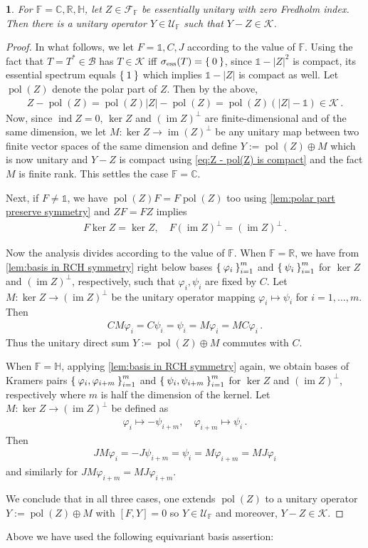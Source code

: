\documentclass[a4paper,10pt]{article}
\numberwithin{equation}{section}
\theoremstyle{plain}
\theoremstyle{plain}
\newtheorem{lem}[thm]{\protect\lemmaname}
\theoremstyle{plain}
\theoremstyle{plain}
\theoremstyle{plain}
\theoremstyle{remark}
\theoremstyle{definition}
\theoremstyle{plain}
\providecommand{\lemmaname}{Lemma}
\newcommand{\RR}{\mathbb{R}}
\newcommand{\CC}{\mathbb{C}}
\newcommand{\FF}{\mathbb{F}}
\newcommand{\calB}{\mathcal{B}}
\newcommand{\calF}{\mathcal{F}}
\newcommand{\calU}{\mathcal{U}}
\newcommand{\calK}{\mathcal{K}}
\newcommand{\Id}{\mathds{1}}
\newcommand{\HH}{\mathbb{H}}
\newcommand{\findex}{\operatorname{ind}}
\newcommand{\im}{\operatorname{im}}
\newcommand{\eq}[1]{\begin{align*}#1\end{align*}}
\newcommand{\eql}[1]{\begin{align}#1\end{align}}
\newcommand{\polar}{\operatorname{pol}}
\begin{document}
	\begin{lem}\label{lem:extension of zero index Fredholm RCH partial isometries to unitaries} For $\FF=\CC,\RR,\HH$, let $Z\in\calF_\FF$ be essentially unitary with zero Fredholm index. Then there is a unitary operator $Y\in\calU_\FF$ such that $Y-Z\in\calK$.
	\end{lem}
	\begin{proof}
		In what follows, we let $F=\Id,C,J$ according to the value of $\FF$. Using the fact that $T=T^\ast\in\calB$ has $T\in\calK$ iff $\sigma_{\mathrm{ess}}(T)=\Set{0}$, since $\Id-|Z|^2$ is compact, its essential spectrum equals $\Set{1}$ which implies $\Id-|Z|$ is compact as well. Let $\polar(Z)$ denote the polar part of $Z$. Then by the above, 
		\eql{ \label{eq:Z - pol(Z) is compact}
			Z-\polar(Z)=\polar(Z)|Z|-\polar(Z)=\polar(Z)(|Z|-\Id)\in\calK\,.
		} 
		Now, since $\findex Z=0$, $\ker Z$ and $(\im Z)^\perp$ are finite-dimensional and of the same dimension, we let $M:\ker Z \to \im(Z)^\perp$ be any unitary map between two finite vector spaces of the same dimension and define $Y:=\polar(Z)\oplus M$ which is now unitary and $Y-Z$ is compact using \cref{eq:Z - pol(Z) is compact} and the fact $M$ is finite rank. This settles the case $\FF=\CC$.
		
		Next, if $F\neq\Id$, we have $\polar(Z)F=F\polar(Z)$ too using \cref{lem:polar part preserve symmetry} and $ZF=FZ$ implies \eq{F\ker Z=\ker Z,\quad F(\im Z)^\perp=(\im Z)^\perp\,.} 
		
		Now the analysis divides according to the value of $\FF$. When $\FF=\RR$, we have from \cref{lem:basis in RCH symmetry} right below bases $\Set{\varphi_i}_{i=1}^m$ and $\Set{\psi_i}_{i=1}^m$ for $\ker Z$ and $(\im Z)^\perp$, respectively, such that $\varphi_i,\psi_i$ are fixed by $C$. Let $M:\ker Z\to (\im Z)^\perp$ be the unitary operator mapping $\varphi_i\mapsto \psi_i$ for  $i=1,\dots,m$. Then \eq{CM\varphi_i=C\psi_i=\psi_i=M\varphi_i=MC\varphi_i\,.} Thus the unitary direct sum $Y:=\polar(Z)\oplus M$ commutes with $C$. 
		
		When $\FF=\HH$, applying \cref{lem:basis in RCH symmetry} again, we obtain bases of Kramers pairs $\Set{\varphi_i,\varphi_{i+m}}_{i=1}^m$ and $\Set{\psi_i,\psi_{i+m}}_{i=1}^m$ for $\ker Z$ and $(\im Z)^\perp$, respectively where $m$ is half the dimension of the kernel. Let $M:\ker Z\to(\im Z)^\perp$ be defined as \eq{\varphi_i\mapsto -\psi_{i+m},\quad \varphi_{i+m}\mapsto \psi_i\,.} 
		Then \eq{JM\varphi_i=-J\psi_{i+m}=\psi_{i}=M\varphi_{i+m}=MJ\varphi_i} and similarly for $JM\varphi_{i+m}=MJ\varphi_{i+m}$. 
		
		We conclude that in all three cases, one extends $\polar(Z)$ to a unitary operator $Y:=\polar(Z)\oplus M$ with $[F,Y]=0$ so $Y\in\calU_\FF$ and moreover, $Y-Z\in \calK$.
	\end{proof}
	Above we have used the following equivariant basis assertion:        
	
\end{document}
